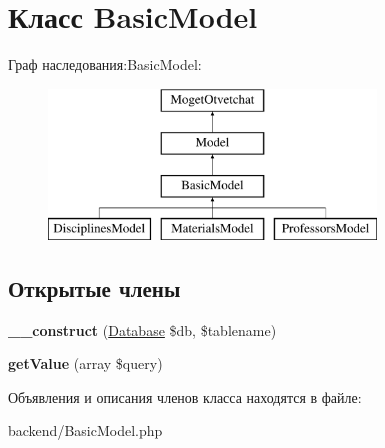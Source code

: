 \hypertarget{classBasicModel}{}\section{Класс Basic\+Model}
\label{classBasicModel}
Граф наследования\+:Basic\+Model\+:\begin{figure}[H]
\begin{center}
\leavevmode
\includegraphics[height=4.000000cm]{classBasicModel}
\end{center}
\end{figure}
\subsection*{Открытые члены}
\begin{DoxyCompactItemize}
\item 
\hypertarget{classBasicModel_a2adeecd61c4fdc6284e879d2a195d550}{}{\bfseries \+\_\+\+\_\+construct} (\hyperlink{classDatabase}{Database} \$db, \$tablename)\label{classBasicModel_a2adeecd61c4fdc6284e879d2a195d550}

\item 
\hypertarget{classBasicModel_a27380f937aa402305546d7624d04efb3}{}{\bfseries get\+Value} (array \$query)\label{classBasicModel_a27380f937aa402305546d7624d04efb3}

\end{DoxyCompactItemize}


Объявления и описания членов класса находятся в файле\+:\begin{DoxyCompactItemize}
\item 
backend/Basic\+Model.\+php\end{DoxyCompactItemize}
